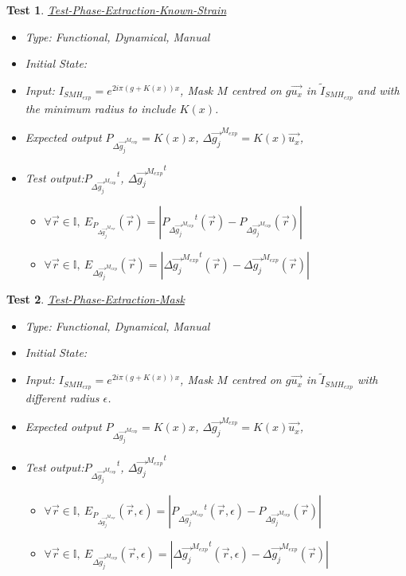 \documentclass[12pt, titlepage]{article}
\newtheorem{Test}{Test}
\begin{document}
\begin{Test}\normalfont\underline{Test-Phase-Extraction-Known-Strain}
\label{T_Phase-Extraction-Known-Strain}
\begin{itemize}
\item Type: Functional, Dynamical, Manual
\item Initial State:
\item Input: $I_{SMH_{exp}}=e^{2i\pi (g+K(x))x}$, Mask $M$ centred on $g\overrightarrow{u_x}$ in $\widetilde{I}_{SMH_{exp}}$ and with the minimum radius to include $K(x)$. 
\item Expected output $P_{\Delta \overrightarrow{g_{j}}^{M_{exp}}}=K(x)x$, $\Delta \overrightarrow{g_{j}}^{M_{exp}}=K(x)\overrightarrow{u_x}$, 
\item Test output:${P_{\Delta \overrightarrow{g_{j}}^{M_{exp}}}}^{t}$, $\Delta {\overrightarrow{g_{j}}^{M_{exp}}}^{t}$
	\begin{itemize}
	\item $\forall \vec{r} \in \mathbb{I}, \ E_{P_{\Delta \overrightarrow{g_{j}}^{M_{exp}}}}(\vec{r})=|{P_{\Delta \overrightarrow{g_{j}}^{M_{exp}}}}^{t}(\vec{r})-P_{\Delta \overrightarrow{g_{j}}^{M_{exp}}}(\vec{r})|$
	\item $\forall \vec{r} \in \mathbb{I}, \ E_{\Delta {\overrightarrow{g_{j}}^{M_{exp}}}}(\vec{r})=|{\Delta {\overrightarrow{g_{j}}^{M_{exp}}}}^t(\vec{r})-{\Delta {\overrightarrow{g_{j}}^{M_{exp}}}}(\vec{r})|$
	\end{itemize}  
\end{itemize}
\end{Test}				
 
\begin{Test}\normalfont\underline{Test-Phase-Extraction-Mask}
\label{T_Phase-Extraction-Mask}
\begin{itemize}
\item Type: Functional, Dynamical, Manual
\item Initial State:
\item Input: $I_{SMH_{exp}}=e^{2i\pi (g+K(x))x}$, Mask $M$ centred on $g\overrightarrow{u_x}$ in $\widetilde{I}_{SMH_{exp}}$ with different radius $\epsilon$. 
\item Expected output $P_{\Delta \overrightarrow{g_{j}}^{M_{exp}}}=K(x)x$, $\Delta \overrightarrow{g_{j}}^{M_{exp}}=K(x)\overrightarrow{u_x}$, 
\item Test output:${P_{\Delta \overrightarrow{g_{j}}^{M_{exp}}}}^{t}$, $\Delta {\overrightarrow{g_{j}}^{M_{exp}}}^{t}$
	\begin{itemize}
	\item $\forall \vec{r} \in \mathbb{I}, \ E_{P_{\Delta \overrightarrow{g_{j}}^{M_{exp}}}}(\vec{r},\epsilon)=|{P_{\Delta \overrightarrow{g_{j}}^{M_{exp}}}}^{t}(\vec{r},\epsilon)-P_{\Delta \overrightarrow{g_{j}}^{M_{exp}}}(\vec{r})|$
	\item $\forall \vec{r} \in \mathbb{I}, \ E_{\Delta {\overrightarrow{g_{j}}^{M_{exp}}}}(\vec{r},\epsilon)=|{\Delta {\overrightarrow{g_{j}}^{M_{exp}}}}^t(\vec{r},\epsilon)-{\Delta {\overrightarrow{g_{j}}^{M_{exp}}}}(\vec{r})|$
	\end{itemize}
\end{itemize}
\end{Test}						
\end{document}
